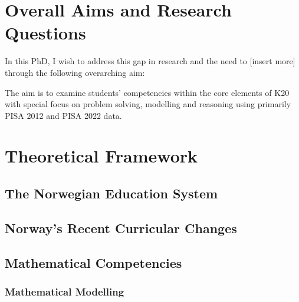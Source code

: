\documentclass[
    a4paper,                %
    11pt,                   %
    stu,                    %
    donotrepeattitle,       %
    floatsintext,           %
    biblatex,               %
    colorlinks=true,        %
    linkcolor=red,          %
    anchorcolor=black,      %
    citecolor=blue,         %
    urlcolor=blue,          %
    bookmarks=true,         %
    bookmarksopen=false,    %
    bookmarksnumbered=true, %
    dvipsnames              %
]{apa7}
\begin{document}

\section{Overall Aims and Research Questions}

In this PhD, I wish to address this gap in research and the need to [insert more] through the following overarching aim:

The aim is to examine students' competencies within the core elements of K20 with special focus on problem solving, modelling and reasoning using primarily PISA 2012 and PISA 2022 data.



\section{Theoretical Framework}


\subsection{The Norwegian Education System}

\subsection{Norway's Recent Curricular Changes}

\subsection{Mathematical Competencies}

\subsubsection{Mathematical Modelling}
\end{document}
